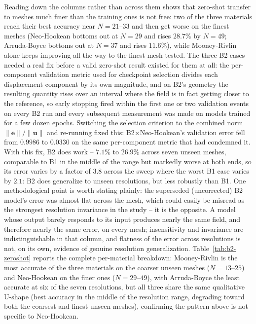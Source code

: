 \documentclass[final,5p,times]{elsarticle}
\begin{document}
Reading down the columns rather than across them shows that zero-shot
transfer to meshes much finer than the training ones is not free: two of
the three materials reach their best accuracy near $N{=}21$--$33$ and then
get worse on the finest meshes (Neo-Hookean bottoms out at $N{=}29$ and
rises $28.7\%$ by $N{=}49$; Arruda-Boyce bottoms out at $N{=}37$ and rises
$11.6\%$), while Mooney-Rivlin alone keeps improving all the way to the
finest mesh tested. The three B2 cases needed a real fix before a valid
zero-shot result existed for them at all: the per-component validation
metric used for checkpoint selection divides each displacement component
by its own magnitude, and on B2's geometry the resulting quantity rises
over an interval where the field is in fact getting closer to the
reference, so early stopping fired within the first one or two validation
events on every B2 run and every subsequent measurement was made on models
trained for a few dozen epochs. Switching the selection criterion to the
combined norm $\|\mathbf{e}\|/\|\mathbf{u}\|$ and re-running fixed this:
B2$\times$Neo-Hookean's validation error fell from $0.9986$ to $0.0330$ on
the same per-component metric that had condemned it. With this fix, B2
does work -- $7.1\%$ to $26.9\%$ across seven unseen meshes, comparable to
B1 in the middle of the range but markedly worse at both ends, so its
error varies by a factor of $3.8$ across the sweep where the worst B1 case
varies by $2.1$: B2 does generalize to unseen resolutions, but less robustly than B1.
One methodological point is worth stating plainly: the superseded
(uncorrected) B2 model's error was almost flat across the mesh, which
could easily be misread as the strongest resolution invariance in the
study -- it is the opposite. A model whose output barely responds to its
input produces nearly the same field, and therefore nearly the same
error, on every mesh; insensitivity and invariance are indistinguishable
in that column, and flatness of the error across resolutions is not, on
its own, evidence of genuine resolution generalization.
Table~\ref{tab:b2-zeroshot} reports the complete per-material breakdown:
Mooney-Rivlin is the most accurate of the three materials on the coarser
unseen meshes ($N{=}13$--$25$) and Neo-Hookean on the finer ones
($N{=}29$--$49$), with Arruda-Boyce the least accurate at six of the
seven resolutions, but all three share the same
qualitative U-shape (best accuracy in the middle of the resolution range,
degrading toward both the coarsest and finest unseen meshes), confirming
the pattern above is not specific to Neo-Hookean.
\end{document}
